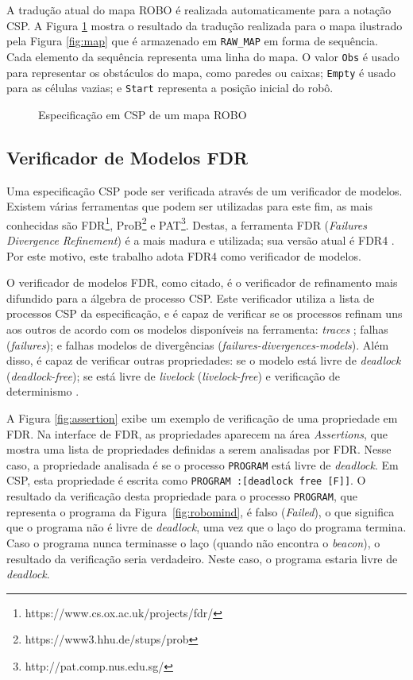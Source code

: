A tradução atual do mapa ROBO é realizada automaticamente para a notação CSP. A Figura \ref{fig:mapcsp} mostra o resultado da tradução realizada para o mapa ilustrado pela Figura \ref{fig:map} que é armazenado em \texttt{RAW\_MAP} em forma de sequência. Cada elemento da sequência representa uma linha do mapa. O valor \texttt{Obs} é usado para representar os obstáculos do mapa, como paredes ou caixas; \texttt{Empty} é usado para as células vazias; e \texttt{Start} representa a posição inicial do robô.

\begin{figure}[h]
\caption{Especificação em CSP de um mapa ROBO}

\label{fig:mapcsp}
\end{figure}

\subsection{Verificador de Modelos FDR}

Uma especificação CSP pode ser verificada através de um verificador de modelos. Existem várias ferramentas que podem ser utilizadas para este fim, as mais conhecidas são FDR\footnote[3]{https://www.cs.ox.ac.uk/projects/fdr/}, ProB\footnote[4]{https://www3.hhu.de/stups/prob} e PAT\footnote[5]{http://pat.comp.nus.edu.sg/}. Destas, a ferramenta FDR (\textit{Failures Divergence Refinement}) é a mais madura e utilizada; sua versão atual é FDR4 \cite{Gibson}. Por este motivo, este trabalho adota FDR4 como verificador de modelos.

O verificador de modelos FDR, como citado, é o verificador de refinamento mais difundido para a álgebra de processo CSP. Este verificador utiliza a lista de processos CSP da especificação, e é capaz de verificar se os processos refinam uns aos outros de acordo com os modelos disponíveis na ferramenta: \textit{traces} ; falhas (\textit{failures}); e falhas modelos de divergências (\textit{failures-divergences-models}). Além disso, é capaz de verificar outras propriedades: se o modelo está livre de \textit{deadlock} (\textit{deadlock-free}); se está livre de \textit{livelock} (\textit{livelock-free}) e verificação de determinismo \cite{Gibson}.

A Figura \ref{fig:assertion} exibe um exemplo de verificação de uma propriedade em FDR. Na interface de FDR, as propriedades aparecem na área \textit{Assertions}, que mostra uma lista de propriedades definidas a serem analisadas por FDR. Nesse caso, a propriedade analisada é se o processo \texttt{PROGRAM} está livre de  \textit{deadlock}. Em CSP, esta propriedade é escrita como \texttt{PROGRAM :[deadlock free [F]]}. O resultado da verificação desta propriedade para o processo \texttt{PROGRAM}, que representa o programa da Figura~\ref{fig:robomind}, é falso (\textit{Failed}), o que significa que o programa não é livre de \textit{deadlock}, uma vez que o laço do programa termina. Caso o programa nunca terminasse o laço (quando não encontra o \textit{beacon}), o resultado da verificação seria verdadeiro. Neste caso, o programa estaria livre de \textit{deadlock}.

